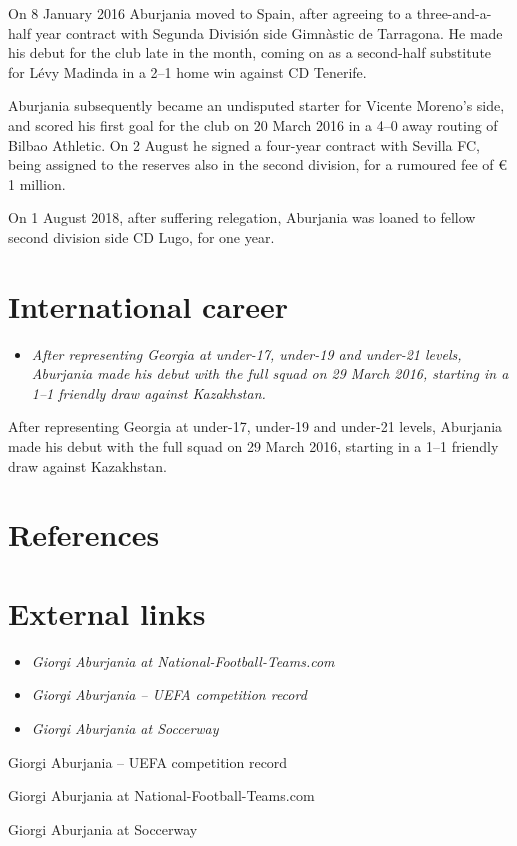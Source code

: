 On 8 January 2016 Aburjania moved to Spain, after agreeing to a
three-and-a-half year contract with Segunda División side Gimnàstic de
Tarragona. He made his debut for the club late in the month, coming on
as a second-half substitute for Lévy Madinda in a 2--1 home win against
CD Tenerife.

Aburjania subsequently became an undisputed starter for Vicente Moreno's
side, and scored his first goal for the club on 20 March 2016 in a 4--0
away routing of Bilbao Athletic. On 2 August he signed a four-year
contract with Sevilla FC, being assigned to the reserves also in the
second division, for a rumoured fee of \euro{} 1 million.

On 1 August 2018, after suffering relegation, Aburjania was loaned to
fellow second division side CD Lugo, for one year.

\section{International career}\label{international-career}

\begin{itemize}
\item
  \emph{After representing Georgia at under-17, under-19 and under-21
  levels, Aburjania made his debut with the full squad on 29 March 2016,
  starting in a 1--1 friendly draw against Kazakhstan.}
\end{itemize}

After representing Georgia at under-17, under-19 and under-21 levels,
Aburjania made his debut with the full squad on 29 March 2016, starting
in a 1--1 friendly draw against Kazakhstan.

\section{References}\label{references}

\section{External links}\label{external-links}

\begin{itemize}
\item
  \emph{Giorgi Aburjania at National-Football-Teams.com}
\item
  \emph{Giorgi Aburjania -- UEFA competition record}
\item
  \emph{Giorgi Aburjania at Soccerway}
\end{itemize}

Giorgi Aburjania -- UEFA competition record

Giorgi Aburjania at National-Football-Teams.com

Giorgi Aburjania at Soccerway
